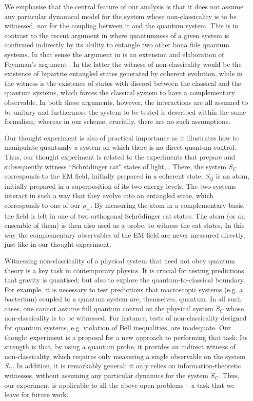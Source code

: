 \documentclass[prl,twocolumn,showpacs,preprintnumbers,amsmath,amssymb]{revtex4}
\newcommand{\qq}[1]{``#1"}
\begin{document}
We emphasise that the central feature of our analysis is that it does not assume any particular dynamical model for the system whose non-classicality is to be witnessed, nor for the coupling between it and the quantum system.  This is in contrast to the recent argument in \cite{tom} where quantumness of a given system is confirmed indirectly by its ability to entangle two other bona fide quantum systems. In that sense the argument in \cite{tom} is an extension and elaboration of Feynman's argument \cite{FEY}. In the latter the witness of non-classicality would be the existence of bipartite entangled states generated by coherent evolution, while in \cite{tom} the witness is the existence of states with discord between the classical and the quantum systems, which forces the classical system to have a complementary observable. In both these arguments, however, the interactions are all assumed to be unitary and furthermore the system to be tested is described within the same formalism; whereas in our scheme, crucially, there are no such assumptions. 

Our thought experiment is also of practical importance as it illustrates how to manipulate quantumly a system on which there is no direct quantum control. Thus, our thought experiment is related to the experiments that prepare and subsequently witness  \qq{Schr\"odinger cat} states of light, \cite{HAR}. There, the system $S_C$ corresponds to the EM field, initially prepared in a coherent state; $S_Q$ is an atom, initially prepared in a superposition of its two energy levels. The two systems interact in such a way that they evolve into an entangled state, which corresponds to one of our $ \rho_{\pm}$. By measuring the atom in a complementary basis, the field is left in one of two orthogonal {Schr\"odinger cat states}. The atom (or an ensemble of them) is then also used as a probe, to witness the {cat states}. In this way the complementary observables of the EM field are never measured directly, just like in our thought experiment. 

Witnessing non-classicality of a physical system that need not obey quantum theory is a key task in contemporary physics.  It is crucial for testing predictions that gravity is quantised; but also to explore the quantum-to-classical boundary. For example, it is necessary to test predictions that macroscopic systems (e.g. a bacterium) coupled to a quantum system are, themselves, quantum. In all such cases, one cannot assume full quantum control on the physical system $S_C$ whose non-classicality is to be witnessed. For instance, tests of non-classicality designed for quantum systems, e.g. violation of Bell inequalities, are inadequate. Our thought experiment is a proposal for a new approach to performing that task.  Its strength is that, by using a quantum probe, it provides an indirect witness of non-classicality, which requires only measuring a single observable on the system $S_C$. In addition, it is remarkably general: it only relies on information-theoretic witnesses, without assuming any particular dynamics for the system $S_C$. Thus, our experiment is applicable to all the above open problems -- a task that we leave for future work.
\end{document}

